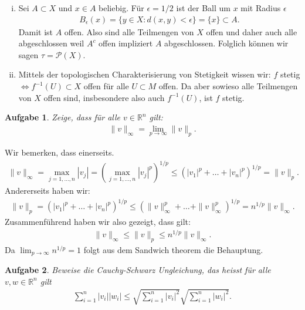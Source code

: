 \documentclass[a4paper, 20]{exam}
\newtheorem{ex}{Aufgabe}
\begin{document}
\begin{solution}
\begin{enumerate}[i)]
\item Sei $A \subset X$ und $x \in A$ beliebig. Für $\epsilon = 1/2$ ist der Ball um $x$ mit Radius $\epsilon$ 
\begin{align*}
B_\epsilon(x)= \{ y \in X : d(x,y) < \epsilon\} = \{x\} \subset A.
\end{align*}
Damit ist $A$ offen. Also sind alle Teilmengen von $X$ offen und daher auch alle abgeschlossen weil $A^c$ offen impliziert $A$ abgeschlossen. Folglich können wir sagen $\tau = \mathcal{P}(X)$. 
\item Mittels der topologischen Charakterisierung von Stetigkeit wissen wir: $f$ stetig $\iff f^{-1}(U) \subset X$ offen für alle $U \subset M$ offen. Da aber sowieso alle Teilmengen von $X$ offen sind, insbesondere also auch $f^{-1}(U)$, ist $f$ stetig. 
\end{enumerate}
\end{solution}

\begin{ex} Zeige, dass für alle $v \in \mathbb{R}^n$ gilt:
\begin{align*}
\|v\|_\infty = \lim_{p \to \infty} \|v\|_p.
\end{align*}
\end{ex}

\begin{solution} Wir bemerken, dass einerseits.
\begin{align*}
\|v\|_\infty = \max_{j=1, \dots ,n} |v_j| = \left( \max_{j=1,  \dots ,n} |v_j|^p \right)^{1/p} \leq \left( |v_1|^p + \dots + |v_n|^p \right)^{1/p} = \|v\|_p.
\end{align*}
Andererseits haben wir:
\begin{align*}
\|v\|_p = ( |v_1|^p + \dots + |v_n|^p)^{1/p} \leq ( \|v\|_\infty^p + \dots + \|v\|_\infty^p)^{1/p} = n^{1/p} \|v\|_\infty.
\end{align*}
Zusammenführend haben wir also gezeigt, dass gilt:
\begin{align*}
\|v\|_\infty \leq \|v\|_p \leq n^{1/p} \|v\|_\infty.
\end{align*}
Da $\lim_{p \to \infty} n^{1/p}=1$ folgt aus dem Sandwich theorem die Behauptung. 
\end{solution}

\begin{ex} Beweise die Cauchy-Schwarz Ungleichung, das heisst für alle $v,w \in \mathbb{R}^n$ gilt
\begin{align*}
\sum_{i=1}^n |v_i||w_i| \leq \sqrt{\sum_{i=1}^n |v_i|^2} \sqrt{\sum_{i=1}^n |w_i|^2}.
\end{align*}
\end{ex}
\end{document}
